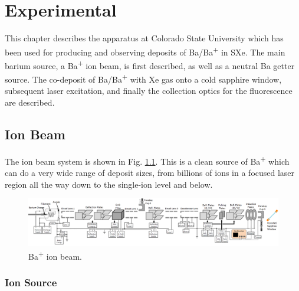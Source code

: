 \chapter{Experimental}


This chapter describes the apparatus at Colorado State University which has been used for producing and observing  deposits of Ba/Ba\textsuperscript{+} in SXe.  The main barium source, a Ba\textsuperscript{+} ion beam, is first described, as well as a neutral Ba getter source.  The co-deposit of Ba/Ba\textsuperscript{+} with Xe gas onto a cold sapphire window, subsequent laser excitation, and finally the collection optics for the fluorescence are described.

\section{Ion Beam}

The ion beam system is shown in Fig. \ref{fig:ionbeam}.  This is a clean source of Ba\textsuperscript{+} which can do a very wide range of deposit sizes, from billions of ions in a focused laser region all the way down to the single-ion level and below.

\begin{figure} %
        \centering
                \includegraphics[angle=90,width=.25\textwidth]{figures/ionBeam.png}
                \caption{Ba\textsuperscript{+} ion beam.}
\label{fig:ionbeam}
\end{figure}

\subsection{Ion Source}

